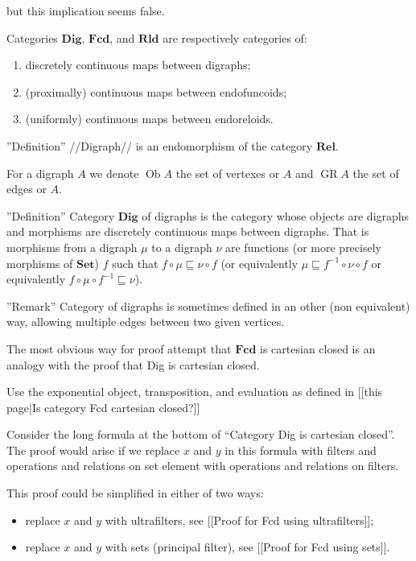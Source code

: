 but this implication seems false.

Categories $\mathbf{Dig}$, $\mathbf{Fcd}$, and $\mathbf{Rld}$ are respectively categories of:
\begin{enumerate}
\item discretely continuous maps between digraphs;
\item (proximally) continuous maps between endofuncoids;
\item (uniformly) continuous maps between endoreloids.
\end{enumerate}

''Definition'' //Digraph// is an endomorphism of the category $\mathbf{Rel}$.

For a digraph $A$ we denote $\operatorname{Ob} A$ the set of vertexes or $A$ and $\operatorname{GR} A$ the set of edges or $A$.

''Definition'' Category $\mathbf{Dig}$ of digraphs is the category whose objects are digraphs and morphisms are discretely continuous maps between digraphs. That is morphisms from a digraph $\mu$ to a digraph $\nu$ are functions (or more precisely morphisms of $\mathbf{Set}$) $f$ such that $f \circ \mu \sqsubseteq \nu \circ f$ (or equivalently $\mu \sqsubseteq f^{- 1} \circ \nu \circ f$ or equivalently $f \circ \mu \circ f^{- 1} \sqsubseteq \nu$).

''Remark'' Category of digraphs is sometimes defined in an other (non equivalent) way, allowing multiple edges between two given vertices.

The most obvious way for proof attempt that $\mathbf{Fcd}$ is cartesian closed is an analogy with the proof that Dig is cartesian closed.

Use the exponential object, transposition, and evaluation as defined in [[this page|Is category Fcd cartesian closed?]]

Consider the long formula at the bottom of ``Category Dig is cartesian closed''. The proof would arise if we replace $x$ and $y$ in this formula with filters and operations and relations on set element with operations and relations on filters.

This proof could be simplified in either of two ways:
\begin{itemize}
\item replace $x$ and $y$ with ultrafilters, see [[Proof for Fcd using ultrafilters]];
\item replace $x$ and $y$ with sets (principal filter), see [[Proof for Fcd using sets]].
\end{itemize}

